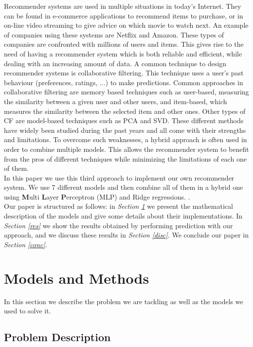 \documentclass[10pt,conference,compsocconf]{IEEEtran}
\begin{document}
Recommender systems are used in multiple situations in today's Internet. They can be found in e-commerce applications to recommend items to purchase, or in on-line video streaming to give advice on which movie to watch next. An example of companies using these systems are Netflix and Amazon. These types of companies are confronted with millions of users and items. This gives rise to the need of having a recommender system which is both reliable and efficient, while dealing with an increasing amount of data. A common technique to design recommender systems is collaborative filtering. This technique uses a user's past behaviour (preferences, ratings, ...) to make predictions. Common approaches in collaborative filtering are memory based techniques such as user-based, measuring the similarity between a given user and other users, and item-based, which measures the similarity between the selected item and other ones. Other types of CF are model-based techniques such as PCA and SVD. These different methods have widely been studied during the past years and all come with their strengths and limitations. To overcome such weaknesses, a hybrid approach is often used in order to combine multiple models. This allows the recommender system to benefit from the pros of different techniques while minimizing the limitations of each one of them.\\
In this paper we use this third approach to implement our own recommender system. We use 7 different models and then combine all of them in a hybrid one using \textbf{M}ulti \textbf{L}ayer \textbf{P}erceptron (MLP) and Ridge regressions. .\\
Our paper is structured as follows: in \emph{Section \ref{mam}} we present the mathematical description of the models and give some details about their implementations. In \emph{Section \ref{res}} we show the results obtained by performing prediction with our approach, and we discuss these results in \emph{Section \ref{disc}}. We conclude our paper in \emph{Section \ref{conc}}.

\section{Models and Methods}
\label{mam}

In this section we describe the problem we are tackling as well as the models we used to solve it.

\subsection{Problem Description}
\end{document}
